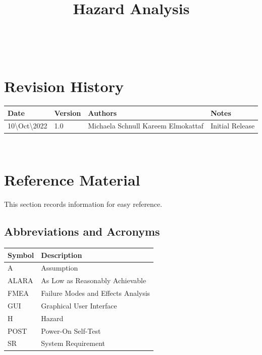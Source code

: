 \documentclass[12pt]{article}
\title{Hazard Analysis\\\progname}
\author{\authname}
\date{}
\begin{document}

\maketitle

\newpage

\tableofcontents
\listoffigures
\listoftables

~\newpage

\section*{Revision History}

\begin{tabularx}{1.0\textwidth}{p{3cm}p{2cm}p{4cm}X}
\toprule {\bf Date} & {\bf Version} & {\bf Authors} & {\bf Notes}\\
\midrule
10\textbackslash Oct\textbackslash 2022 & 1.0 & Michaela Schnull \newline Kareem Elmokattaf  & Initial Release\\
\bottomrule
\end{tabularx}

~\newpage

\section{Reference Material}

This section records information for easy reference.

\subsection{Abbreviations and Acronyms}

\renewcommand{\arraystretch}{1.2}
\begin{tabular}{l l} 
  \toprule		
  \textbf{Symbol} & \textbf{Description}\\
  \midrule 
  A & Assumption\\
  ALARA & As Low as Reasonably Achievable\\
  FMEA & Failure Modes and Effects Analysis\\
  GUI & Graphical User Interface\\
  H & Hazard\\
  POST & Power-On Self-Test\\
  SR & System Requirement\\
  \bottomrule
\end{tabular}\\
\end{document}
